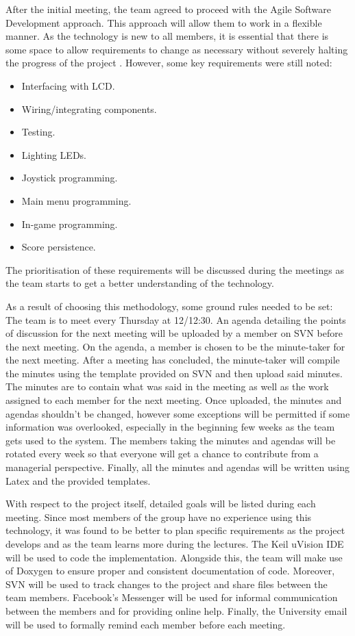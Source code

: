 \documentclass[11pt,a4paper,twocolumn]{article}
\begin{document}
\par{After the initial meeting, the team agreed to proceed with the Agile Software Development approach. This approach will allow them to work in a flexible manner. As the technology is new to all members, it is essential that there is some space to allow requirements to change as necessary without severely halting the progress of the project \cite{agileDev}. However, some key requirements were still noted:
\begin{itemize}
	\item Interfacing with LCD.
	\item Wiring/integrating components.
	\item Testing.
	\item Lighting LEDs.
	\item Joystick programming.
	\item Main menu programming.
	\item  In-game programming.
	\item Score persistence.
\end{itemize}
The prioritisation of these requirements will be discussed during the meetings as the team starts to get a better understanding of the technology.
}
\newline

\par{As a result of choosing this methodology, some ground rules needed to be set: The team is to meet every Thursday at 12/12:30. An agenda detailing the points of discussion for the next meeting will be uploaded by a member on SVN before the next meeting. On the agenda, a member is chosen to be the minute-taker for the next meeting. After a meeting has concluded, the minute-taker will compile the minutes using the template provided on SVN and then upload said minutes. The minutes are to contain what was said in the meeting as well as the work assigned to each member for the next meeting. Once uploaded, the minutes and agendas shouldn't be changed, however some exceptions will be permitted if some information was overlooked, especially in the beginning few weeks as the team gets used to the system. The members taking the minutes and agendas will be rotated every week so that everyone will get a chance to contribute from a managerial perspective. Finally, all the minutes and agendas will be written using Latex and the provided templates.}
\newline

\par{With respect to the project itself, detailed goals will be listed during each meeting. Since most members of the group have no experience using this technology, it was found to be better to plan specific requirements as the project develops and as the team learns more during the lectures. The Keil uVision IDE will be used to code the implementation. Alongside this, the team will make use of Doxygen to ensure proper and consistent documentation of code. Moreover, SVN will be used to track changes to the project and share files between the team members. Facebook's Messenger will be used for informal communication between the members and for providing online help. Finally, the University email will be used to formally remind each member before each meeting.}
\end{document}
